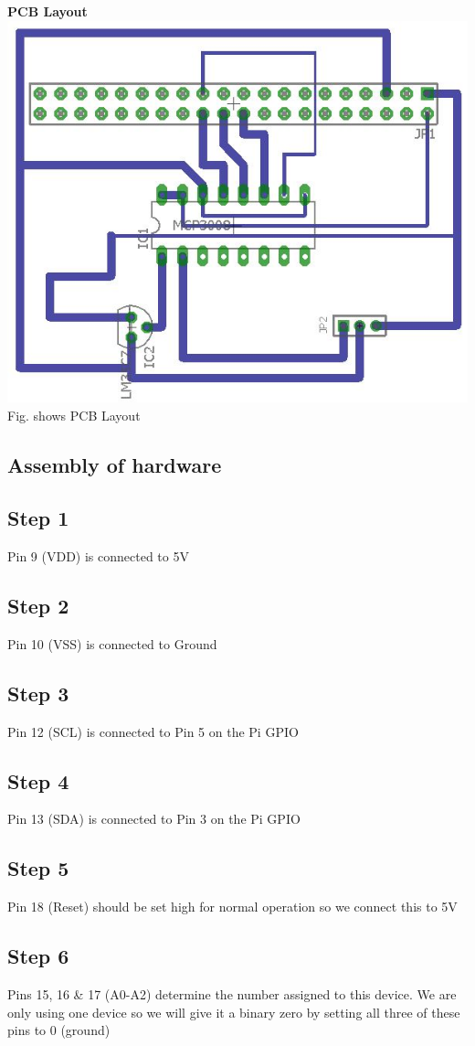 \documentclass[a4paper,12pt,oneside]{book}
\begin{document}
\flushleft
\textbf{PCB Layout}\\
\centering
\includegraphics[scale=0.4]{adc_layout}
\flushleft
Fig. shows PCB Layout
\subsection*{Assembly of hardware}
\subsection*{Step 1}
Pin 9 (VDD) is connected to 5V
\subsection*{Step 2}
Pin 10 (VSS) is connected to Ground
\subsection*{Step 3}
Pin 12 (SCL) is connected to Pin 5 on the Pi GPIO
\subsection*{Step 4}
Pin 13 (SDA) is connected to Pin 3 on the Pi GPIO
\subsection*{Step 5}
Pin 18 (Reset) should be set high for normal operation so we connect this to 5V
\subsection*{Step 6}
Pins 15, 16 \& 17 (A0-A2) determine the number assigned to this device. We are only using one device so we will give it a binary zero by setting all three of these pins to 0 (ground)
\end{document}
